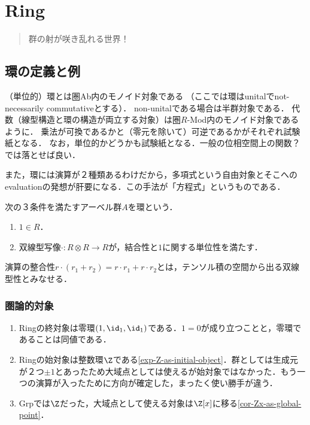 \documentclass[uplatex,dvipdfmx]{jsreport}
\begin{document}
\chapter{Ring}

\begin{quotation}
    群の射が咲き乱れる世界！
\end{quotation}

\section{環の定義と例}

\begin{tcolorbox}[colframe=ForestGreen, colback=ForestGreen!10!white,breakable,colbacktitle=ForestGreen!40!white,coltitle=black,fonttitle=\bfseries\sffamily,
title=]
    （単位的）環とは圏Ab内のモノイド対象である
    （ここでは環はunitalでnot-necessarily commutativeとする）．
    non-unitalである場合は半群対象である．
    代数（線型構造と環の構造が両立する対象）は圏$R$-Mod内のモノイド対象であるように．
    乗法が可換であるかと（零元を除いて）可逆であるかがそれぞれ試験紙となる．
    なお，単位的かどうかも試験紙となる．一般の位相空間上の関数？では落とせば良い．

    また，環には演算が２種類あるわけだから，多項式という自由対象とそこへのevaluationの発想が肝要になる．この手法が「方程式」というものである．
\end{tcolorbox}

\begin{definition}[ring]
    次の３条件を満たすアーベル群$A$を環という．
    \begin{enumerate}
        \item $1\in R$．
        \item 双線型写像$\cdot:R\otimes R\to R$が，結合性と$1$に関する単位性を満たす．
    \end{enumerate}
\end{definition}
\begin{remarks}
    演算の整合性$r\cdot(r_1+r_2)=r\cdot r_1+r\cdot r_2$とは，テンソル積の空間から出る双線型性とみなせる．
\end{remarks}

\subsection{圏論的対象}

\begin{example}\mbox{}
    \begin{enumerate}
        \item Ringの終対象は零環$(1,\id_1,\id_1)$である．$1=0$が成り立つことと，零環であることは同値である．
        \item Ringの始対象は整数環$\Z$である\ref{exp-Z-as-initial-object}．群としては生成元が２つ$\pm 1$とあったため大域点としては使えるが始対象ではなかった．もう一つの演算が入ったために方向が確定した，まったく使い勝手が違う．
        \item Grpでは$\Z$だった，大域点として使える対象は$\Z[x]$に移る\ref{cor-Zx-as-global-point}．
    \end{enumerate}
\end{example}
\end{document}

